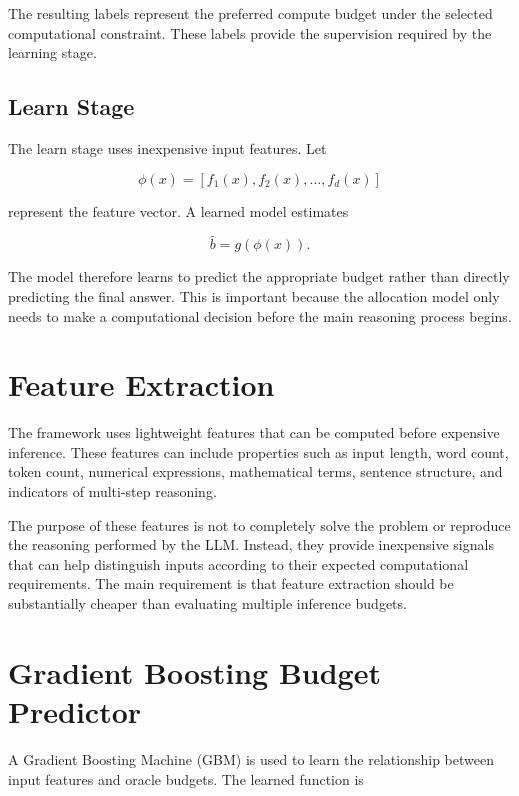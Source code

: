 \documentclass[12pt,a4paper,titlepage]{report}
\begin{document}
The resulting labels represent the preferred compute budget under the selected computational constraint. These labels provide the supervision required by the learning stage.

\subsection{Learn Stage}

The learn stage uses inexpensive input features. Let

\begin{equation}
\phi(x)
=
[f_1(x),f_2(x),\ldots,f_d(x)]
\end{equation}

represent the feature vector. A learned model estimates

\begin{equation}
\hat{b}=g(\phi(x)).
\end{equation}

The model therefore learns to predict the appropriate budget rather than directly predicting the final answer. This is important because the allocation model only needs to make a computational decision before the main reasoning process begins.

\section{Feature Extraction}

The framework uses lightweight features that can be computed before expensive inference. These features can include properties such as input length, word count, token count, numerical expressions, mathematical terms, sentence structure, and indicators of multi-step reasoning.

The purpose of these features is not to completely solve the problem or reproduce the reasoning performed by the LLM. Instead, they provide inexpensive signals that can help distinguish inputs according to their expected computational requirements. The main requirement is that feature extraction should be substantially cheaper than evaluating multiple inference budgets.

\section{Gradient Boosting Budget Predictor}

A Gradient Boosting Machine (GBM) is used to learn the relationship between input features and oracle budgets. The learned function is
\end{document}
